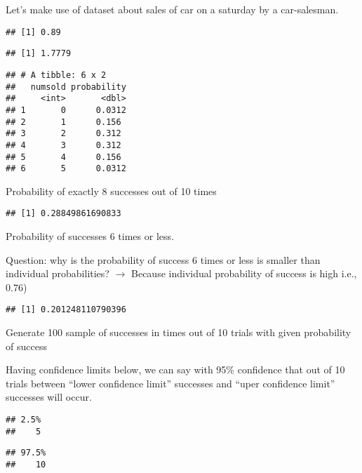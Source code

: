 \documentclass[ignorenonframetext,aspectratio=169]{beamer}
\begin{document}
\begin{frame}[fragile]{}
\protect\hypertarget{section-16}{}

Let's make use of dataset about sales of car on a saturday by a
car-salesman.

\begin{verbatim}
## [1] 0.89
\end{verbatim}

\begin{verbatim}
## [1] 1.7779
\end{verbatim}

\begin{verbatim}
## # A tibble: 6 x 2
##   numsold probability
##     <int>       <dbl>
## 1       0      0.0312
## 2       1      0.156 
## 3       2      0.312 
## 4       3      0.312 
## 5       4      0.156 
## 6       5      0.0312
\end{verbatim}

\end{frame}

\begin{frame}[fragile]{}
\protect\hypertarget{section-17}{}

Probability of exactly 8 successes out of 10 times

\begin{verbatim}
## [1] 0.28849861690833
\end{verbatim}

Probability of successes 6 times or less.

Question: why is the probability of success 6 times or less is smaller
than individual probabilities? \(\longrightarrow\) Because individual
probability of success is high i.e., 0.76)

\begin{verbatim}
## [1] 0.201248110790396
\end{verbatim}

Generate 100 sample of successes in times out of 10 trials with given
probability of success

\end{frame}

\begin{frame}[fragile]{}
\protect\hypertarget{section-18}{}

Having confidence limits below, we can say with 95\% confidence that out
of 10 trials between ``lower confidence limit'' successes and ``uper
confidence limit'' successes will occur.

\begin{verbatim}
## 2.5% 
##    5
\end{verbatim}

\begin{verbatim}
## 97.5% 
##    10
\end{verbatim}

\end{frame}
\end{document}
